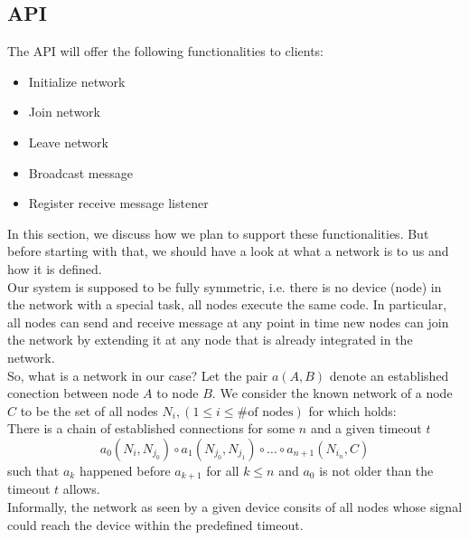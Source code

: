 		\subsection{API}
		The API will offer the following functionalities to clients:
		\begin{itemize}
			\item {Initialize network}
			\item {Join network}
			\item {Leave network}
			\item {Broadcast message}
			\item {Register receive message listener}
		\end{itemize}
		In this section, we discuss how we plan to support these functionalities. But before starting with that, we should have a look at
		what a network is to us and how it is defined.\\
		Our system is supposed to be fully symmetric, i.e. there is no device (node) in the network with a special task, all nodes execute the same code. In particular, all nodes can send and receive message at any point in time new nodes can join the network by extending it at any node that is already integrated in the network.\\
		So, what is a network in our case? Let the pair $a(A,B)$ denote an established conection between node $A$ to node $B$. We consider the known network of a node $C$ to be the set of all nodes $N_i, (1 \leq i \leq \text{\# of nodes})$ for which holds:  \\
		There is a chain of established connections for some $n$ and a given timeout $t$
		\begin{displaymath}
			a_0(N_{i},N_{j_0}) \circ a_1(N_{j_0},N_{j_1}) \circ \ldots \circ a_{n+1}(N_{i_n},C)
		\end{displaymath}
		such that $a_k$ happened before $a_{k+1}$ for all $k \leq n$ and $a_0$ is not older than the timeout $t$ allows. \\
		Informally, the network as seen by a given device consits of all nodes whose signal could reach the device within the predefined timeout. \\ \\
			
